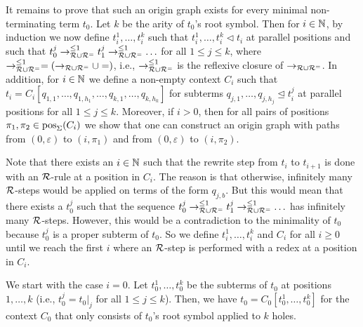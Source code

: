 \begin{myproof}
    It remains to prove that such an origin graph exists for
    every minimal non-terminating term $t_0$.
Let $k$ be the arity of 
$t_0$'s root symbol.
Then for $i \in \mathbb{N}$, by induction we  now define
$t_i^1,\ldots,t_i^k$ such that $t_i^1,\ldots,t_i^k \triangleleft t_i$ at parallel
positions and such that $t_0^j \to_{\mathcal{R} \cup \mathcal{R}^=}^{\leq 1} t_1^j \to_{\mathcal{R} \cup \mathcal{R}^=}^{\leq
  1} \ldots$ for all $1 \leq j \leq k$, where $\to_{\mathcal{R} \cup \mathcal{R}^=}^{\leq 1} = (\to_{\mathcal{R} \cup \mathcal{R}^=} \cup =)$, i.e., 
$\to_{\mathcal{R} \cup \mathcal{R}^=}^{\leq 1}$ is the reflexive closure of $\to_{\mathcal{R} \cup \mathcal{R}^=}$. In addition, for $i \in \mathbb{N}$ we define 
a non-empty context $C_i$
such that $t_i = C_i[q_{1,1},\ldots,q_{1,h_1}, \ldots, q_{k,1}, \ldots, q_{k, h_k}]$ for
subterms $q_{j,1},\ldots,q_{j,h_j} \trianglelefteq t_i^j$ at parallel positions for all $1
\leq j \leq k$.
Moreover, if $i > 0$, then for all pairs of positions $\pi_1, \pi_2 \in \mathrm{pos}_\Sigma(C_i)$
    we show that one
    can construct an origin graph with paths from $(0,\varepsilon)$ to $(i, \pi_1)$ and
from $(0,\varepsilon)$ to
    $(i, \pi_2)$.

  Note that there exists an $i \in \mathbb{N}$ such that the rewrite
    step from $t_i$ to $t_{i+1}$ is done with an $\mathcal{R}$-rule at a position in $C_i$. 
    The reason is that otherwise,
infinitely many $\mathcal{R}$-steps would be applied on terms of the form $q_{j,b}$. But this would
mean that there exists a $t_0^j$ such that the sequence 
 $t_0^j \to_{\mathcal{R} \cup \mathcal{R}^=}^{\leq 1} t_1^j \to_{\mathcal{R} \cup \mathcal{R}^=}^{\leq
  1} \ldots$ has infinitely many $\mathcal{R}$-steps. However, this 
would be a contradiction to the minimality of $t_0$ because
 $t_0^j$ is a proper subterm of $t_0$.
So we define $t_i^1,\ldots,t_i^k$ and $C_i$ for all $i \geq 0$ until we reach the first $i$
where
an $\mathcal{R}$-step is performed with a redex at a position in $C_i$.



    We start with the case $i=0$. 
Let
    $t_0^{1}, \ldots, t_0^{k}$ be the subterms of $t_0$ at positions $1, \ldots, k$
    (i.e., $t_0^j = t_0|_j$ for all $1 \leq j \leq k$).
    Then, we have $t_0 = C_0[t_0^{1}, \ldots, t_0^{k}]$ for the context $C_0$ that only consists
    of $t_0$'s root symbol applied to $k$ holes.





\end{myproof}
